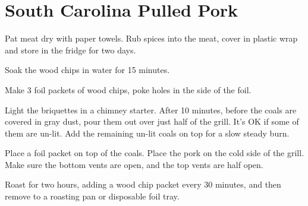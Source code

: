\section{South Carolina Pulled Pork}
\begin{recipe}



Pat meat dry with paper towels. Rub spices into the meat, cover in plastic wrap and store in the fridge for two days.


Soak the wood chips in water for 15 minutes.

Make 3 foil packets of wood chips, poke holes in the side of the foil.


Light the briquettes in a chimney starter. After 10 minutes, before the coals are covered in gray dust, pour them out over just half of the grill.
It's OK if some of them are un-lit. Add the remaining un-lit coals on top for a slow steady burn.

Place a foil packet on top of the coals. Place the pork on the cold side of the grill.
Make sure the bottom vents are open, and the top vents are half open.

Roast for two hours, adding a wood chip packet every 30 minutes, and then remove to a roasting pan or disposable foil tray.



\end{recipe}

